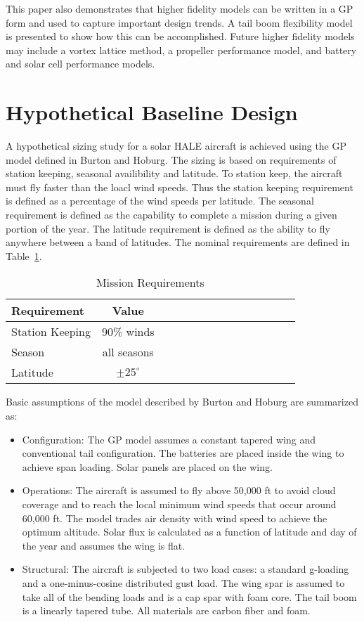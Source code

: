 \documentclass[]{aiaa-tc}%
\begin{document}
This paper also demonstrates that higher fidelity models can be written in a GP form and used to capture important design trends.  
A tail boom flexibility model is presented to show how this can be accomplished.  
Future higher fidelity models may include a vortex lattice method, a propeller performance model, and battery and solar cell performance models. 

\section{Hypothetical Baseline Design}

A hypothetical sizing study for a solar HALE aircraft is achieved using the GP model defined in Burton and Hoburg.\cite{burton_solar_2017} 
The sizing is based on requirements of station keeping, seasonal availibility and latitude. 
To station keep, the aircraft must fly faster than the loacl wind speeds.  
Thus the station keeping requirement is defined as a percentage of the wind speeds per latitude.  
The seasonal requirement is defined as the capability to complete a mission during a given portion of the year.  
The latitude requirement is defined as the ability to fly anywhere between a band of latitudes. 
The nominal requirements are defined in Table~\ref{t:mreqs}.

\begin{longtable}{lccccccccccccc}
\caption{Mission Requirements}\\
\toprule
\toprule
\label{t:mreqs}
Requirement & Value \\ \hline
Station Keeping & 90\% winds \\
Season & all seasons\\
Latitude & $\pm25^{\circ}$\\
\bottomrule
\end{longtable}

Basic assumptions of the model described by Burton and Hoburg are summarized as: 

\begin{itemize}
    \item Configuration: The GP model assumes a constant tapered wing and conventional tail configuration.  The batteries are placed inside the wing to achieve span loading.  Solar panels are placed on the wing.  
    \item Operations: The aircraft is assumed to fly above 50,000 ft to avoid cloud coverage and to reach the local minimum wind speeds that occur around 60,000 ft.\cite{burton_solar_2017} The model trades air density with wind speed to achieve the optimum altitude. Solar flux is calculated as a function of latitude and day of the year and assumes the wing is flat. 
    \item Structural: The aircraft is subjected to two load cases: a standard g-loading and a one-minus-cosine distributed gust load.  The wing spar is assumed to take all of the bending loads and is a cap spar with foam core. The tail boom is a linearly tapered tube.  All materials are carbon fiber and foam.  
    \end{itemize}
\end{document}
